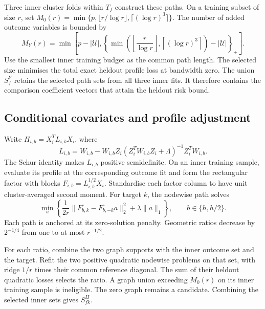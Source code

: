 Three inner cluster folds within $T_f$ construct these paths. On a
training subset of size $r$, set
$M_0(r)=\min\{p,\lfloor r/\log r\rfloor,\lceil(\log r)^3\rceil\}$.
The number of added outcome variables is bounded by
\begin{equation}\label{eq:search-budget}
 M_Y(r)=\min\!\left[p-|\mathcal U|,
 \left\{\min\!\left(\left\lfloor\frac r{\log r}\right\rfloor,
                  \left\lceil(\log r)^3\right\rceil\right)
           -|\mathcal U|\right\}_+\right].
\end{equation}
Use the smallest inner training budget as the common path length.
The selected size minimises the total exact heldout profile loss at
bandwidth zero. The union $S_f^Y$ retains the selected path sets from
all three inner fits. It therefore contains the comparison coefficient
vectors that attain the heldout risk bound.

\subsection{Conditional covariates and profile adjustment}\label{subsec:graphs}

Write $H_{i,b}=X_i^TL_{i,b}X_i$, where
\[
 L_{i,b}=W_{i,b}-W_{i,b}Z_i
          (Z_i^TW_{i,b}Z_i+\Lambda)^{-1}Z_i^TW_{i,b}.
\]
The Schur identity makes $L_{i,b}$ positive semidefinite. On an inner
training sample, evaluate its profile at the corresponding outcome
fit and form the rectangular factor with blocks
$F_{i,b}=L_{i,b}^{1/2}X_i$. Standardise each factor column to have unit
cluster-averaged second moment. For target $k$, the nodewise path solves
\begin{equation}\label{eq:nodewise-fit}
 \min_a\left\{\frac{1}{2r}
       \|F_{b,k}^{\circ}-F_{b,-k}^{\circ}a\|_2^2
                   +\lambda\|a\|_1\right\},\qquad b\in\{h,h/2\}.
\end{equation}
Each path is anchored at its zero-solution penalty. Geometric ratios
decrease by $2^{-1/4}$ from one to at most $r^{-1/2}$.

For each ratio, combine the two graph supports with the inner outcome
set and the target. Refit the two positive quadratic nodewise problems
on that set, with ridge $1/r$ times their common reference diagonal.
The sum of their heldout quadratic losses selects the ratio. A graph
union exceeding $M_0(r)$ on its inner training sample is ineligible. The
zero graph remains a candidate. Combining the selected inner sets
gives $S_{fk}^H$.

